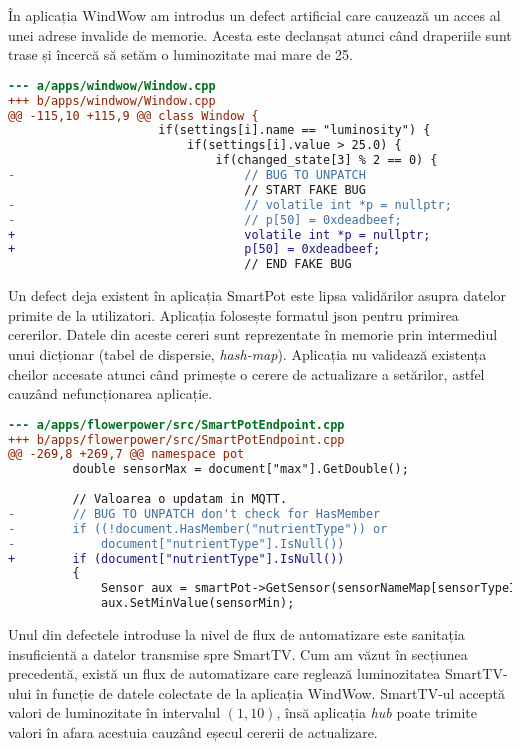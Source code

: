 În aplicația WindWow am introdus un defect artificial care cauzează un acces al unei adrese invalide de memorie. Acesta este declanșat atunci când draperiile sunt trase și încercă să setăm o luminozitate mai mare de 25.

\begin{lstlisting}[language=diff, caption={Accesarea adresei nule va cauza oprirea aplicației WindWow}]
--- a/apps/windwow/Window.cpp
+++ b/apps/windwow/Window.cpp
@@ -115,10 +115,9 @@ class Window {
                     if(settings[i].name == "luminosity") {
                         if(settings[i].value > 25.0) {
                             if(changed_state[3] % 2 == 0) {
-                                // BUG TO UNPATCH
                                 // START FAKE BUG
-                                // volatile int *p = nullptr;
-                                // p[50] = 0xdeadbeef;
+                                volatile int *p = nullptr;
+                                p[50] = 0xdeadbeef;
                                 // END FAKE BUG
\end{lstlisting}

Un defect deja existent în aplicația SmartPot este lipsa validărilor asupra datelor primite de la utilizatori. Aplicația folosește formatul \acrshort{json} pentru primirea cererilor. Datele din aceste cereri sunt reprezentate în memorie prin intermediul unui dicționar (tabel de dispersie, \textit{hash-map}). Aplicația nu validează existența cheilor accesate atunci când primește o cerere de actualizare a setărilor, astfel cauzând nefuncționarea aplicație.

\begin{lstlisting}[language=diff, caption={Lipsa validării cheilor JSON în aplicația SmartPot}]
--- a/apps/flowerpower/src/SmartPotEndpoint.cpp
+++ b/apps/flowerpower/src/SmartPotEndpoint.cpp
@@ -269,8 +269,7 @@ namespace pot
         double sensorMax = document["max"].GetDouble();
 
         // Valoarea o updatam in MQTT.
-        // BUG TO UNPATCH don't check for HasMember
-        if ((!document.HasMember("nutrientType")) or
-            document["nutrientType"].IsNull())
+        if (document["nutrientType"].IsNull())
         {
             Sensor aux = smartPot->GetSensor(sensorNameMap[sensorTypeID]);
             aux.SetMinValue(sensorMin);
\end{lstlisting}

Unul din defectele introduse la nivel de flux de automatizare este sanitația insuficientă a datelor transmise spre SmartTV. Cum am văzut în secțiunea precedentă, există un flux de automatizare care reglează luminozitatea SmartTV-ului în funcție de datele colectate de la aplicația WindWow. SmartTV-ul acceptă valori de luminozitate în intervalul $(1, 10)$, însă aplicația \textit{hub} poate trimite valori în afara acestuia cauzând eșecul cererii de actualizare.


